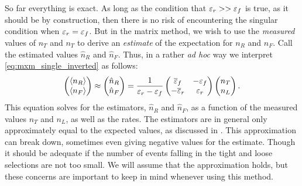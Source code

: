 So far everything is exact. As long as the condition
that $\varepsilon_r>>\varepsilon_f$ is true,
as it should be by construction, 
then there is no risk of encountering the singular condition
when $\varepsilon_r=\varepsilon_f$.
But in the matrix method, 
we wish to use the \emph{measured} values of $n_T$
and $n_T$ to derive an \emph{estimate} of the expectation
for $n_R$ and $n_F$. Call the estimated values $\hat{n}_R$ and $\hat{n}_F$. 
Thus, in a rather \emph{ad hoc} way 
we interpret \eqn\eqref{eq:mxm_single_inverted} as follows:
\begin{equation}
  \label{eq:mxm_single_inverted_approx}
  \begin{pmatrix} \langle n_R\rangle \\ \langle n_F\rangle \end{pmatrix} 
  \approx
  \begin{pmatrix} \hat{n}_R \\ \hat{n}_F \end{pmatrix} 
  =
  \frac{1}{\varepsilon_r-\varepsilon_f}
  \begin{pmatrix}
  \overline{\varepsilon}_f & -\varepsilon_f \\ -\overline{\varepsilon}_r & \varepsilon_r
  \end{pmatrix} 
  \begin{pmatrix} n_T \\ n_L \end{pmatrix}.
\end{equation}
This equation solves for the estimators, $\hat{n}_R$ and $\hat{n}_F$,
as a function of the measured values $n_T$ and $n_L$, as well 
as the rates. The estimators are in general only approximately equal
to the expected values, as discussed in \cite{Gillam:2014xua}.
This approximation can break down, sometimes even giving negative values
for the estimate.  Though it should be adequate if the number
of events falling in the tight and loose selections are 
not too small.
We will assume that the approximation holds, but these concerns are important
to keep in mind whenever using this method.


